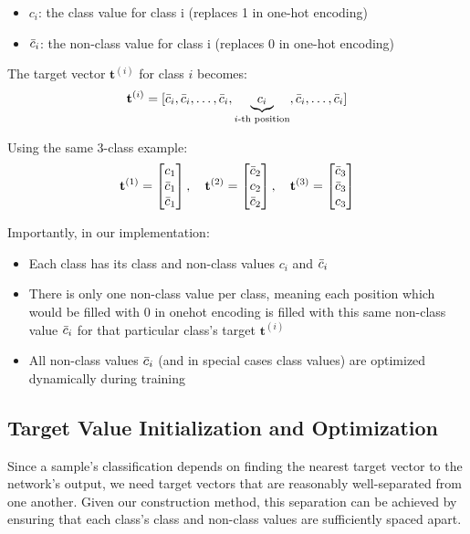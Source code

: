 \documentclass[12pt,fleqn,a4paper]{article}
\begin{document}
\begin{itemize}
\item $c_i$: the class value for class i (replaces 1 in one-hot encoding)
\item $\Bar{c}_i$: the non-class value for class i (replaces 0 in one-hot encoding)
\end{itemize}

The target vector $\mathbf{t}^{(i)}$ for class $i$ becomes:
$$\mathbf{t}^{(i)} = [\Bar{c}_i, \Bar{c}_i, \ldots, \Bar{c}_i, \underbrace{c_i}_{i\text{-th position}}, \Bar{c}_i, \ldots, \Bar{c}_i]$$

Using the same 3-class example:
$$\mathbf{t}^{(1)} = \begin{bmatrix} c_1 \\ \Bar{c}_1 \\ \Bar{c}_1 \end{bmatrix}, \quad 
\mathbf{t}^{(2)} = \begin{bmatrix} \Bar{c}_2 \\ c_2 \\ \Bar{c}_2 \end{bmatrix}, \quad 
\mathbf{t}^{(3)} = \begin{bmatrix} \Bar{c}_3 \\ \Bar{c}_3 \\ c_3 \end{bmatrix}$$

Importantly, in our implementation:
\begin{itemize}
\item Each class has its class and non-class values $c_i$ and $\Bar{c}_i$
\item There is only one non-class value per class, meaning each position which would be filled with 0 in onehot encoding is filled with this same non-class value $\Bar{c}_i$ for that particular class's target $\mathbf{t}^{(i)}$

\item All non-class values $\Bar{c}_i$ (and in special cases class values) are optimized dynamically during training
\end{itemize}

\subsection{Target Value Initialization and Optimization}
Since a sample's classification depends on finding the nearest target vector to the network's output, we need target vectors that are reasonably well-separated from one another. Given our construction method, this separation can be achieved by ensuring that each class's class and non-class values are sufficiently spaced apart.
\end{document}
